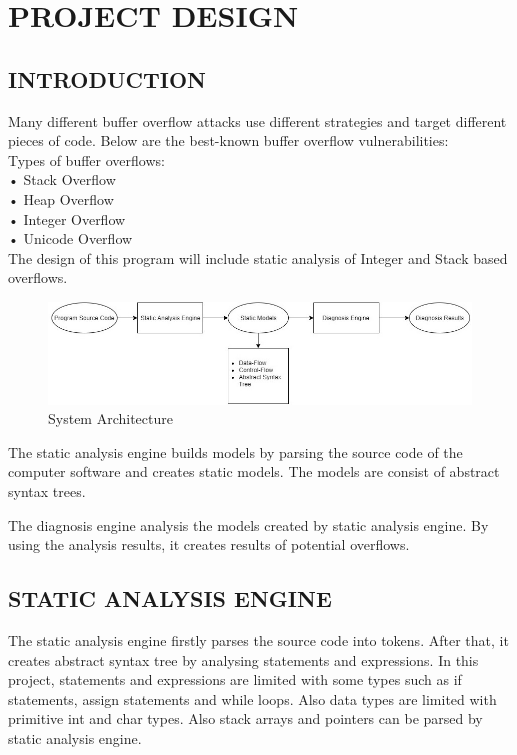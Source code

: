\chapter{PROJECT DESIGN}
\section{INTRODUCTION}

Many different buffer overflow attacks use different strategies and target different
pieces of code. Below are the best-known buffer overflow vulnerabilities:\\
Types of buffer overflows:\\
•	Stack Overflow\\
•	Heap Overflow\\
•	Integer Overflow\\
•	Unicode Overflow\\

The design of this program will include static analysis of Integer and Stack based overflows.

\begin{figure}[!htbp]
    \centering
    \includegraphics[width=1\textwidth]{Imgs/static_analysis.jpg}
    \caption{\label{fig:SysArch}System Architecture}
\end{figure}

The static analysis engine builds models by parsing the source code of the computer software and creates static models. The models are consist of abstract syntax trees.

The diagnosis engine analysis the models created by static analysis engine. By using the analysis results, it creates results of potential overflows. 

\section{STATIC ANALYSIS ENGINE}
The static analysis engine firstly parses the source code into tokens. After that, it creates abstract syntax tree by analysing statements and expressions. In this project, statements and expressions are limited with some types such as if statements, assign statements and while loops. Also data types are limited with primitive int and char types. Also stack arrays and pointers can be parsed by static analysis engine.

